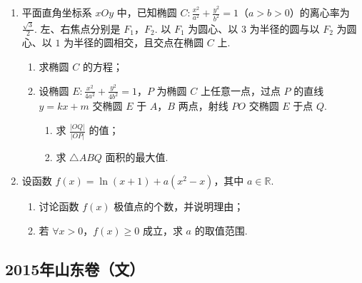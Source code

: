 \begin{description}
\begin{enumerate}[leftmargin=5pt]
        \item 平面直角坐标系 \(xOy\) 中，已知椭圆 \(C: \frac{x^2}{a^2} + \frac{y^2}{b^2} = 1\)（\(a > b > 0\)）的离心率为 \(\frac{\sqrt{3}}{2}\). 左、右焦点分别是 \(F_1\)，\(F_2\). 以 \(F_1\) 为圆心、以 \(3\) 为半径的圆与以 \(F_2\) 为圆心、以 \(1\) 为半径的圆相交，且交点在椭圆 \(C\) 上.
\begin{enumerate}
\item 求椭圆 \(C\) 的方程；
\item 设椭圆 \(E: \frac{x^2}{4a^2} + \frac{y^2}{4b^2} = 1\)，\(P\) 为椭圆 \(C\) 上任意一点，过点 \(P\) 的直线 \(y = kx + m\) 交椭圆 \(E\) 于 \(A\)，\(B\) 两点，射线 \(PO\) 交椭圆 \(E\) 于点 \(Q\).
\begin{enumerate}
\item 求 \(\frac{|OQ|}{|OP|}\) 的值；
\item 求 \(\triangle ABQ\) 面积的最大值.
\end{enumerate}
\end{enumerate}

        \item 设函数 \(f(x) = \ln(x + 1) + a(x^2 - x)\)，其中 \(a \in \mathbb{R}\).
\begin{enumerate}
\item 讨论函数 \(f(x)\) 极值点的个数，并说明理由；
\item 若 \(\forall x > 0\)，\(f(x) \geqslant 0\) 成立，求 \(a\) 的取值范围.
\end{enumerate}

    \end{enumerate}

\end{description}


\subsection{2015年山东卷（文）}\label{gk:2015年山东卷（文）}


